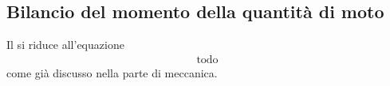 \documentclass[letterpaper,10pt,italian]{jupyterBook}
\begin{document}
\subsection{Bilancio del momento della quantità di moto}
\label{\detokenize{ch/thermodynamics/principles-open:bilancio-del-momento-della-quantita-di-moto}}\label{\detokenize{ch/thermodynamics/principles-open:physics-hs-thermodynamics-foundation-principles-open-angular-momentum}}
\sphinxAtStartPar
Il {\hyperref[\detokenize{ch/mechanics/dynamics-eom-open:physics-hs-mechanics-dynamics-eom-open-angular-momentum}]{}} si riduce all’equazione
\begin{equation*}
\begin{split}\text{todo}\end{split}
\end{equation*}
\sphinxAtStartPar
come già discusso nella parte di meccanica.
\end{document}
